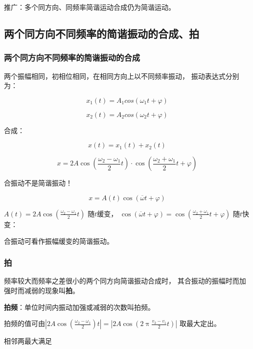 \documentclass[
	12pt, %
	a4paper, %
]{myLegrandOrangeBook}
\begin{document}
    推广：多个同方向、同频率简谐运动合成仍为简谐运动。

\subsection{两个同方向不同频率的简谐振动的合成、拍}

\subsubsection{两个同方向不同频率的简谐振动的合成}

    两个振幅相同，初相位相同，在相同方向上以不同频率振动，
    振动表达式分别为：

    \[
        x_1\left(t\right) = A_1 cos\left(\omega_1 t + \varphi\right)
    \]

    \[
        x_2\left(t\right) = A_2 cos\left(\omega_2 t + \varphi\right)
    \]

    合成：

    \[
        x\left(t\right) = x_1\left(t\right) + x_2\left(t\right)
    \]

    \begin{equation}
        x=2 A \cos \left(\frac{\omega_2-\omega_1}{2} t\right) \cdot \cos \left(\frac{\omega_2+\omega_1}{2} t+\varphi\right)
    \end{equation}

    合振动不是简谐振动！

    $$
        x=A(t) \cos (\overline{\omega} t+\varphi)
    $$

    $A(t)=2 A \cos \left(\frac{\omega_2-\omega_1}{2} t\right)$
    随\(t \)缓变，
    $\cos (\overline{\omega} t+\varphi)=\cos \left(\frac{\omega_2+\omega_1}{2} t+\varphi\right)$
    随\(t \)快变：

    合振动可看作振幅缓变的简谐振动。

\subsubsection{拍}

    频率较大而频率之差很小的两个同方向简谐振动合成时，
    其合振动的振幅时而加强时而减弱的现象叫\textbf{拍}。

    \textbf{拍频}：单位时间内振动加强或减弱的次数叫拍频。

    拍频的值可由$\left|2 A \cos \left(\frac{\omega_2-\omega_1}{2}\right) t\right|=\left|2 A \cos \left(2 \uppi \frac{v_2-v_1}{2} t\right)\right|$
    取最大定出。

    相邻两最大满足
\end{document}
